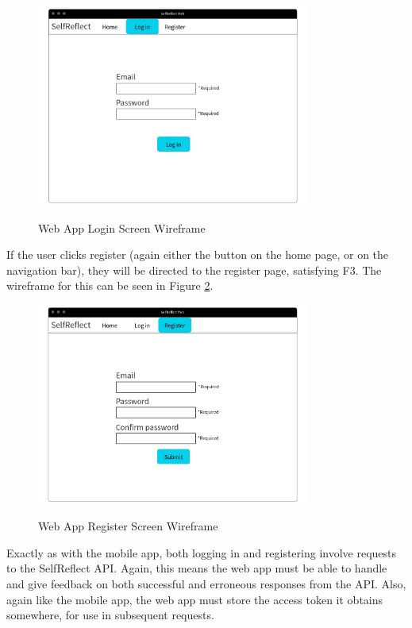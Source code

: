 \documentclass[11pt,openright,a4paper]{report}
\begin{document}
\begin{figure}[ht]
\centering
\caption{Web App Login Screen Wireframe}
\includegraphics[width=0.8\textwidth]{i/weblogin.png}
\label{fig:weblogin}
\end{figure}

\newpage

If the user clicks register (again either the button on the home page, or on the navigation bar), they will be directed to the register page, satisfying F3. The wireframe for this can be seen in Figure \ref{fig:webregister}.

\begin{figure}[ht]
\centering
\caption{Web App Register Screen Wireframe}
\includegraphics[width=0.8\textwidth]{i/webregister.png}
\label{fig:webregister}
\end{figure}

Exactly as with the mobile app, both logging in and registering involve requests to the SelfReflect API. Again, this means the web app must be able to handle and give feedback on both successful and erroneous responses from the API. Also, again like the mobile app, the web app must store the access token it obtains somewhere, for use in subsequent requests.
\end{document}
